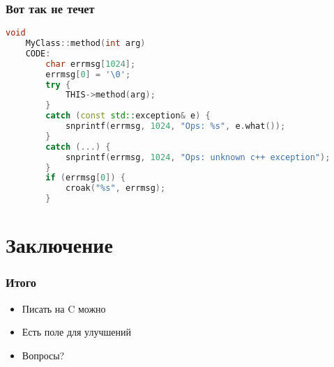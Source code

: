 \documentclass[pdflatex,hyperref={unicode=true}]{beamer}
\DeclareRobustCommand{\cpp}{
    \texorpdfstring{\hbox{C\hspace{-0.5ex}\protect\raisebox{0.5ex}{\protect\scalebox{0.67}{++}}}}{C++}
}
\begin{document}
\begin{frame}[fragile]
    \frametitle{Вот так не течет}
    \begin{lstlisting}[language=C++,style=PerlXS]
    void
    MyClass::method(int arg)
    CODE:
        char errmsg[1024];
        errmsg[0] = '\0';
        try {
            THIS->method(arg);
        }
        catch (const std::exception& e) {
            snprintf(errmsg, 1024, "Ops: %s", e.what());
        }
        catch (...) {
            snprintf(errmsg, 1024, "Ops: unknown c++ exception");
        }
        if (errmsg[0]) {
            croak("%s", errmsg);
        }
    \end{lstlisting}
\end{frame}

\section{Заключение}

\begin{frame}
    \frametitle{Итого}
    \begin{itemize}[<+->]
        \item Писать на \cpp можно
        \item Есть поле для улучшений
        \item Вопросы?
    \end{itemize}
\end{frame}
\end{document}
